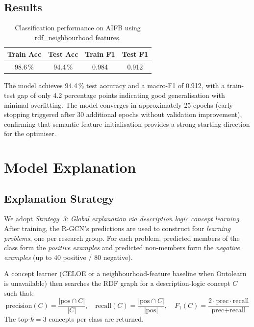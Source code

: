 \documentclass[runningheads]{llncs}
\begin{document}
\subsection{Results}

\begin{table}[ht]
\centering
\caption{Classification performance on AIFB using rdf\_neighbourhood features.}
\label{tab:results}
\begin{tabular}{cccc}
\toprule
\textbf{Train Acc} & \textbf{Test Acc} & \textbf{Train F1} & \textbf{Test F1} \\
\midrule
98.6\,\% & 94.4\,\% & 0.984 & 0.912 \\
\bottomrule
\end{tabular}
\end{table}

The model achieves 94.4\,\% test accuracy and a macro-F1 of 0.912, with a train-test gap of
only 4.2 percentage points indicating good generalisation with minimal overfitting.
The model converges in approximately 25 epochs (early stopping triggered after 30 additional epochs
without validation improvement), confirming that semantic feature initialisation provides
a strong starting direction for the optimiser.

\section{Model Explanation}

\subsection{Explanation Strategy}

We adopt \emph{Strategy~3: Global explanation via description logic concept learning}.
After training, the R-GCN's predictions are used to construct four \emph{learning problems},
one per research group.
For each problem, predicted members of the class form the \emph{positive examples}
and predicted non-members form the \emph{negative examples} (up to 40 positive / 80 negative).

A concept learner (CELOE or a neighbourhood-feature baseline when Ontolearn is unavailable)
then searches the RDF graph for a description-logic concept $C$ such that:
\[
\text{precision}(C) = \frac{|\text{pos} \cap C|}{|C|}, \quad
\text{recall}(C) = \frac{|\text{pos} \cap C|}{|\text{pos}|}, \quad
F_1(C) = \frac{2 \cdot \text{prec} \cdot \text{recall}}{\text{prec} + \text{recall}}
\]
The top-$k=3$ concepts per class are returned.
\end{document}
